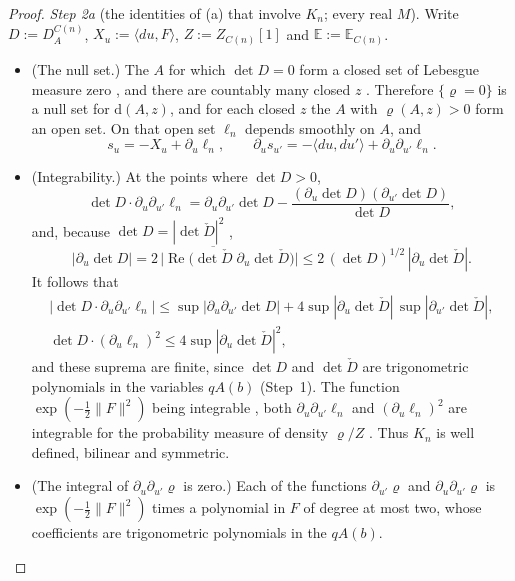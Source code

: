 \documentclass[11pt,letterpaper,reqno]{amsart}
\theoremstyle{definition}
\begin{document}
\begin{proof}
\emph{Step 2a} (the identities of (a) that involve $K_n$; every real $M$).
Write $D:=D^{C(n)}_A$, $X_u:=\langle du,F\rangle$, $Z:=Z_{C(n)}[1]$ and $\mathbb E:=\mathbb E_{C(n)}$.
\begin{itemize}
\item[(i)] (The null set.)
The $A$ for which $\det D=0$ form a closed set of Lebesgue measure zero \cite[Theorem~4.25\,(c)]{QEDII}, and there are countably many closed $z$ \cite[Definition~2.6]{QEDII}.
Therefore $\{\varrho=0\}$ is a null set for $\mathrm d(A,z)$, and for each closed $z$ the $A$ with $\varrho(A,z)>0$ form an open set.
On that open set $\ell_n$ depends smoothly on $A$, and
\begin{equation*}
s_u=-X_u+\partial_u\ell_n,\qquad\partial_us_{u'}=-\langle du,du'\rangle+\partial_u\partial_{u'}\ell_n.
\end{equation*}
\item[(ii)] (Integrability.)
At the points where $\det D>0$,
\begin{equation*}
\det D\cdot\partial_u\partial_{u'}\ell_n=\partial_u\partial_{u'}\det D-\frac{(\partial_u\det D)(\partial_{u'}\det D)}{\det D},
\end{equation*}
and, because $\det D=|\det\check D|^2$ \cite[Proposition~3.18\,(d)]{QEDII},
\begin{equation*}
|\partial_u\det D|=2\,\bigl|\operatorname{Re}\bigl(\overline{\det\check D}\;\partial_u\det\check D\bigr)\bigr|\le2\,(\det D)^{1/2}\,|\partial_u\det\check D|.
\end{equation*}
It follows that
\begin{gather*}
|\det D\cdot\partial_u\partial_{u'}\ell_n|\le\sup|\partial_u\partial_{u'}\det D|+4\sup|\partial_u\det\check D|\,\sup|\partial_{u'}\det\check D|,\\
\det D\cdot(\partial_u\ell_n)^2\le4\sup|\partial_u\det\check D|^2,
\end{gather*}
and these suprema are finite, since $\det D$ and $\det\check D$ are trigonometric polynomials in the variables $qA(b)$ (Step~1).
The function $\exp(-\frac12\|F\|^2)$ being integrable \cite[Lemma~3.14]{QEDII}, both $\partial_u\partial_{u'}\ell_n$ and $(\partial_u\ell_n)^2$ are integrable for the probability measure of density $\varrho/Z$ \cite[Definition~2.13]{QEDII}.
Thus $K_n$ is well defined, bilinear and symmetric.
\item[(iii)] (The integral of $\partial_u\partial_{u'}\varrho$ is zero.)
Each of the functions $\partial_{u'}\varrho$ and $\partial_u\partial_{u'}\varrho$ is $\exp(-\frac12\|F\|^2)$ times a polynomial in $F$ of degree at most two, whose coefficients are trigonometric polynomials in the $qA(b)$.

\end{itemize}
\end{proof}
\end{document}
